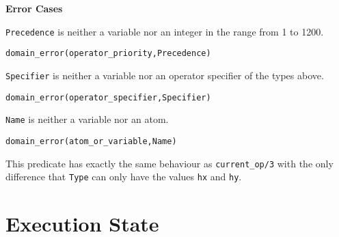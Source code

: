 \begin{description}
{\bf Error Cases}
\bi
\item 	{\tt Precedence} is neither a variable nor an integer in the
range from 1 to 1200. 
\bi
\item 	{\tt domain\_error(operator\_priority,Precedence)}
\ei
\item 	{\tt Specifier} is neither a variable nor an operator
specifier of the types above.
\bi
\item 	{\tt domain\_error(operator\_specifier,Specifier)}
\ei
\item 	{\tt Name} is neither a variable nor an atom.
\bi
\item 	{\tt domain\_error(atom\_or\_variable,Name)}
\ei
\ei

    This predicate has exactly the same behaviour as {\tt current\_op/3}
    with the only difference that {\tt Type} can only have the values
    {\tt hx} and {\tt hy}.


\end{description}








\section{Execution State}\label{environmental}

